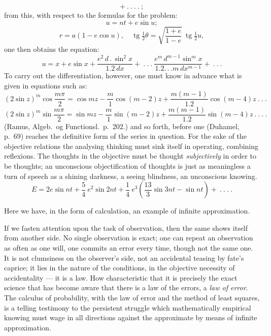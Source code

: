 \documentclass[12pt,a4paper]{book}
\renewcommand{\thefootnote}{*)}
\begin{document}
{\[+ \ .\ .\ .\ .\ ;
\]
from this, with respect to the formulas for the problem:
\[
u = nt + e \sin u;
\]
\[
r = a (1 - e \cos u), \quad \operatorname{tg} \tfrac{1}{2} \theta =
\sqrt{\frac{1 + e}{1 - e}}\ \operatorname{tg} \tfrac{1}{2} u,
\]
one then obtains the equation:
\[
u = x + e \sin x + \frac{e^{2}\, d\, .\, \sin^{2} x}{1.2\ dx}
+ \ .\ .\ .\ \frac{e^{m}\, d^{m-1} \sin^{m} x}{1.2 .\,.\,. m\ dx^{m-1}}
+ \ .\ .\ .
\]
To carry out the differentiation, however, one must know in advance what is given in equations such as:
\[
(2 \sin z)^{m} \cos \frac{m \pi}{2} = \cos mz - \frac{m}{1} \cos (m-2) z
+ \frac{m (m-1)}{1.2} \cos (m-4) z \ .\ .\ .
\]
\[
(2 \sin z)^{m} \sin \frac{m \pi}{2} = \sin mz - \frac{m}{1} \sin (m-2) z
+ \frac{m (m-1)}{1.2} \sin (m-4) z \ .\ .\ .\ .
\]
(Ramus, Algeb.\ og Functionsl.\ p.\ 202.)
and so forth, before one (Duhamel, p.\ 69) reaches the definitive form of the series in question. For the sake
of the objective relations the analysing thinking must sink itself in operating, combining
reflexions. The thoughts in the objective must be thought \emph{subjectively} in order to be thoughts; an
unconscious objectification of thoughts is just as meaningless a turn of speech as a shining darkness, a
seeing blindness, an unconscious knowing.}%
\renewcommand{\thefootnote}{*)}
\[
E = 2e \sin nt + \frac{5}{4}\ e^{2} \sin 2nt + \frac{1}{4}\ e^{3}
\left( \frac{13}{3} \sin 3nt - \sin nt \right) + \ .\ .\ .\ .
\]

Here we have, in the form of calculation, an example of infinite approximation.

If we fasten attention upon the task of observation, then the same shows itself from another side. No single
observation is exact; one can repeat an observation as often as one will, one commits an error every time,
though not the same one. It is not clumsiness on the observer's side, not an accidental teasing by fate's
caprice; it lies in the nature of the conditions, in the objective necessity of accidentality --- it is a law.
How characteristic that it is precisely
the exact science that has become aware that there is a law of the errors, a \emph{law of error}. The calculus
of probability, with the law of error and the method of least squares, is a telling testimony to the
persistent struggle which mathematically empirical knowing must wage in all directions against the approximate
by means of infinite approximation.
\end{document}
